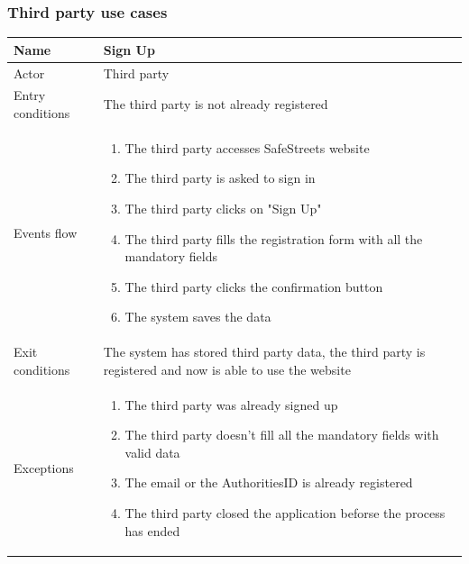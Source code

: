 \documentclass{article}
\begin{document}
\subsubsection{Third party use cases}
\begin{table}[H]
    \begin{tabular}{|l|l|}
    \hline
     Name & \begin{minipage}[t]{0.7\textwidth}\textbf{Sign Up}\end{minipage} \\ \hline  
     Actor & \begin{minipage}[t]{0.7\textwidth} Third party\end{minipage} \\ \hline 
     Entry conditions & \begin{minipage}[t]{0.7\textwidth} The third party is
     not already registered\end{minipage} \\
     \hline 
     Events flow & \begin{minipage}[t]{0.7\textwidth} 
    \begin{enumerate}
        \item The third party accesses SafeStreets website
        \item The third party is asked to sign in
        \item The third party clicks on "Sign Up"
        \item The third party fills the registration form with all the mandatory
        fields
        \item The third party clicks the confirmation button
        \item The system saves the data
    \end{enumerate}
    \end{minipage} \\ \hline
     Exit conditions & \begin{minipage}[t]{0.7\textwidth} The system has stored
     third party data, the third party is registered and now is able to use the
     website\end{minipage} \\
     \hline
     Exceptions & \begin{minipage}[t]{0.7\textwidth}
    \begin{enumerate}
        \item The third party was already signed up
        \item The third party doesn't fill all the mandatory fields with valid
        data
        \item The email or the AuthoritiesID is already registered
        \item The third party closed the application beforse the process has
        ended
    \end{enumerate}    
    \end{minipage} \\ \hline
    \end{tabular}
\end{table}
\end{document}
